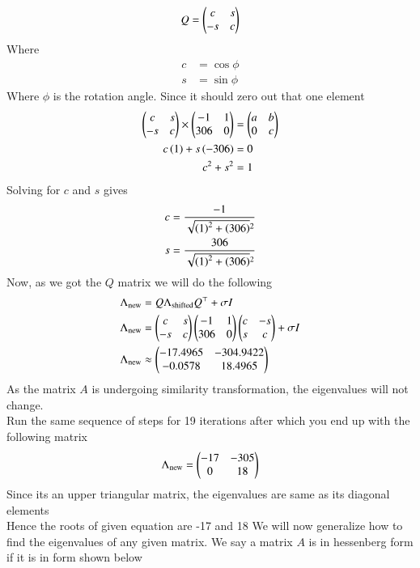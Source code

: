 \documentclass[journal]{IEEEtran}
\begin{document}
\begin{align}
Q &= \begin{pmatrix}c & s\\-s & c\end{pmatrix}\\
\end{align}
Where
\begin{align}
c &= \cos{\phi}\\
s &= \sin{\phi}
\end{align}
Where $\phi$ is the rotation angle. Since it should zero out that one element\\
\begin{align}
	\begin{pmatrix}c & s\\-s & c\end{pmatrix} \times \begin{pmatrix}-1 & 1\\306 & 0\end{pmatrix} &= \begin{pmatrix}a & b\\ 0 & c\end{pmatrix}\\
	c\left(1\right) + s\left(-306\right) &= 0\\
	c^2+s^2 &= 1
\end{align}
Solving for $c$ and $s$ gives
\begin{align}
	c &= \frac{-1}{\sqrt{\left(1\right)^2+\left(306\right)}^2}\\
	s &= \frac{306}{\sqrt{\left(1\right)^2+\left(306\right)}^2}
\end{align}
Now, as we got the $Q$ matrix we will do the following
\begin{align}
\Lambda_{\text{new}} &= Q\Lambda_{\text{shifted}}Q^\top + \sigma I\\
\Lambda_{\text{new}} &= \begin{pmatrix}c & s\\-s & c\end{pmatrix}\begin{pmatrix}-1 & 1\\306 & 0\end{pmatrix}\begin{pmatrix}c & -s\\s & c\end{pmatrix} + \sigma I\\
\Lambda_{\text{new}} &\approx \begin{pmatrix}-17.4965&-304.9422\\-0.0578&18.4965\end{pmatrix}
\end{align}
As the matrix $A$ is undergoing similarity transformation, the eigenvalues will not change.\\
Run the same sequence of steps for 19 iterations after which you end up with the following matrix
\begin{align}
    \Lambda_{\text{new}} = \begin{pmatrix}-17&-305\\0&18\end{pmatrix}
\end{align}
Since its an upper triangular matrix, the eigenvalues are same as its diagonal elements\\
Hence the roots of given equation are -17 and 18\newline \newline
We will now generalize how to find the eigenvalues of any given matrix. We say a matrix $A$ is in hessenberg form if it is in form shown below
\end{document}
